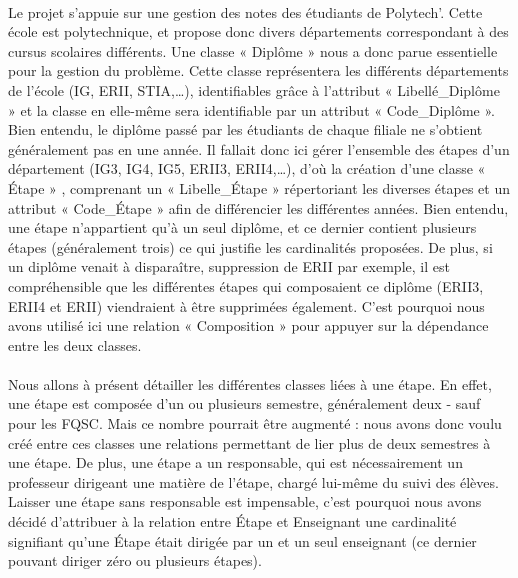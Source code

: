 \documentclass[letter, 11pt] {article}
\begin{document}
	\paragraph{ }Le projet s'appuie sur une gestion des notes des étudiants de Polytech'. Cette école est polytechnique, et propose donc divers départements correspondant à des cursus scolaires différents. Une classe « Diplôme » nous a donc parue essentielle pour la gestion du problème. Cette classe représentera les différents départements de l'école (IG, ERII, STIA,…), identifiables grâce à l'attribut « Libellé\_Diplôme » et la classe en elle-même sera identifiable par un attribut « Code\_Diplôme ». Bien entendu, le diplôme passé par les étudiants de chaque filiale ne s'obtient généralement pas en une année. Il fallait donc ici gérer l'ensemble des étapes d'un département (IG3, IG4, IG5, ERII3, ERII4,…), d'où la création d'une classe « Étape » , comprenant un « Libelle\_Étape » répertoriant les diverses étapes et un attribut « Code\_Étape » afin de différencier les différentes années. Bien entendu, une étape n'appartient qu'à un seul diplôme, et ce dernier contient plusieurs étapes (généralement trois) ce qui justifie les cardinalités proposées. De plus, si un diplôme venait à disparaître, suppression de ERII par exemple, il est compréhensible que les différentes étapes qui composaient ce diplôme (ERII3, ERII4 et ERII) viendraient à être supprimées également. C'est pourquoi nous avons utilisé ici une relation « Composition »  pour appuyer sur la dépendance entre les deux classes.

	\paragraph{ }Nous allons à présent détailler les différentes classes liées à une étape. En effet, une étape est composée d'un ou plusieurs semestre, généralement deux - sauf pour les FQSC. Mais ce nombre pourrait être augmenté : nous avons donc voulu créé entre ces classes une relations permettant de lier plus de deux semestres à une étape. De plus, une étape a un responsable, qui est nécessairement un professeur dirigeant une matière de l'étape, chargé lui-même du suivi des élèves. Laisser une étape sans responsable est impensable, c'est pourquoi nous avons décidé d'attribuer à la relation entre Étape et Enseignant une cardinalité signifiant qu'une Étape était dirigée par un et un seul enseignant (ce dernier pouvant diriger zéro ou plusieurs étapes).
\end{document}
